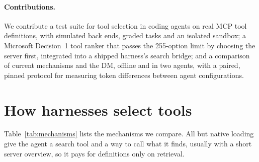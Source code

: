 \documentclass[11pt]{article}
\begin{document}
\paragraph{Contributions.} We contribute a test suite for tool selection in coding agents on real MCP tool
definitions, with simulated back ends, graded tasks and an isolated sandbox; a Microsoft Decision~1 tool ranker
that passes the 255-option limit by choosing the server first, integrated into a shipped harness's search bridge;
and a comparison of current mechanisms and the DM, offline and in two agents, with a paired, pinned protocol for
measuring token differences between agent configurations.

\section{How harnesses select tools}\label{sec:background}
Table~\ref{tab:mechanisms} lists the mechanisms we compare. All but native loading give the agent a search tool
and a way to call what it finds, usually with a short server overview, so it pays for definitions only on
retrieval.
\end{document}
